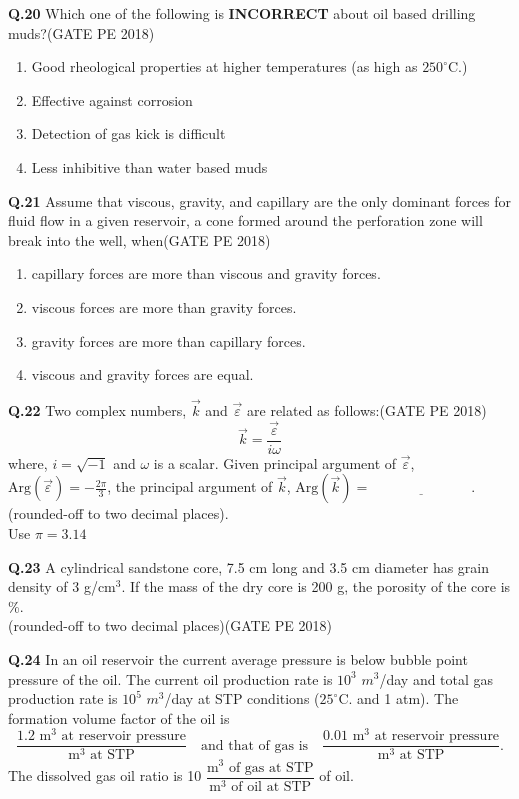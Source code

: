 \documentclass[journal,12pt,onecolumn]{IEEEtran}
\theoremstyle{remark}
\begin{document}
\noindent
\textbf{Q.20}  Which one of the following is \textbf{INCORRECT} about oil based drilling muds?\hfill(GATE PE 2018)
\begin{enumerate}
\item Good rheological properties at higher temperatures (as high as $250^\circ\text{C}$.)
\item Effective against corrosion
\item Detection of gas kick is difficult
\item Less inhibitive than water based muds
\end{enumerate}

\noindent
\textbf{Q.21} Assume that viscous, gravity, and capillary are the only dominant forces for fluid flow in a
given reservoir, a cone formed around the perforation zone will break into the well, when\hfill(GATE PE 2018)
\begin{enumerate}
\item capillary forces are more than viscous and gravity forces.
\item viscous forces are more than gravity forces.
\item gravity forces are more than capillary forces.
\item viscous and gravity forces are equal.
\end{enumerate}

\noindent\textbf{Q.22} Two complex numbers, $\vec{k}$ and $\vec{\varepsilon}$ are related as follows:\hfill(GATE PE 2018)
\[
\vec{k} = \frac{\vec{\varepsilon}}{i\omega}
\]
where, $i = \sqrt{-1}$ and $\omega$ is a scalar. Given principal argument of $\vec{\varepsilon}$, $\text{Arg}(\vec{\varepsilon}) = -\frac{2\pi}{3}$, the principal argument of $\vec{k}$, $\text{Arg}(\vec{k}) = \underline{\hspace{3cm}}$. (rounded-off to two decimal places). \\
Use $\pi = 3.14$

\vspace{1cm}

\noindent\textbf{Q.23} A cylindrical sandstone core, 7.5 cm long and 3.5 cm diameter has grain density of 3 g/cm$^3$. If the mass of the dry core is 200 g, the porosity of the core is \underline{\hspace{3cm}} \%.\\
(rounded-off to two decimal places)\hfill(GATE PE 2018)

\vspace{1cm}

\noindent\textbf{Q.24} In an oil reservoir the current average pressure is below bubble point pressure of the oil. The current oil production rate is $10^3$ $m^3$/day and total gas production rate is $10^5$ $m^3$/day at STP conditions ($25^\circ\text{C}$. and 1 atm). The formation volume factor of the oil is
\[
\frac{1.2 \text{ m}^3 \text{ at reservoir pressure}}{\text{m}^3 \text{ at STP}} \quad \text{and that of gas is} \quad \frac{0.01 \text{ m}^3 \text{ at reservoir pressure}}{\text{m}^3 \text{ at STP}}.
\]
The dissolved gas oil ratio is 10 $\dfrac{\text{m}^3 \text{ of gas at STP}}{\text{m}^3 \text{ of oil at STP}}$ of oil.
\end{document}

